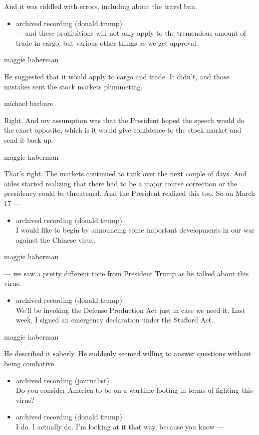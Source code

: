 And it was riddled with errors, including about the travel ban.

\begin{itemize}
\tightlist
\item
  archived recording (donald trump)\\
  --- and these prohibitions will not only apply to the tremendous
  amount of trade in cargo, but various other things as we get approval.
\end{itemize}

maggie haberman

He suggested that it would apply to cargo and trade. It didn't, and
those mistakes sent the stock markets plummeting.

michael barbaro

Right. And my assumption was that the President hoped the speech would
do the exact opposite, which is it would give confidence to the stock
market and send it back up.

maggie haberman

That's right. The markets continued to tank over the next couple of
days. And aides started realizing that there had to be a major course
correction or the presidency could be threatened. And the President
realized this too. So on March 17 ---

\begin{itemize}
\tightlist
\item
  archived recording (donald trump)\\
  I would like to begin by announcing some important developments in our
  war against the Chinese virus.
\end{itemize}

maggie haberman

--- we saw a pretty different tone from President Trump as he talked
about this virus.

\begin{itemize}
\tightlist
\item
  archived recording (donald trump)\\
  We'll be invoking the Defense Production Act just in case we need it.
  Last week, I signed an emergency declaration under the Stafford Act.
\end{itemize}

maggie haberman

He described it soberly. He suddenly seemed willing to answer questions
without being combative.

\begin{itemize}
\item
  archived recording (journalist)\\
  Do you consider America to be on a wartime footing in terms of
  fighting this virus?
\item
  archived recording (donald trump)\\
  I do. I actually do. I'm looking at it that way, because you know ---
\end{itemize}

